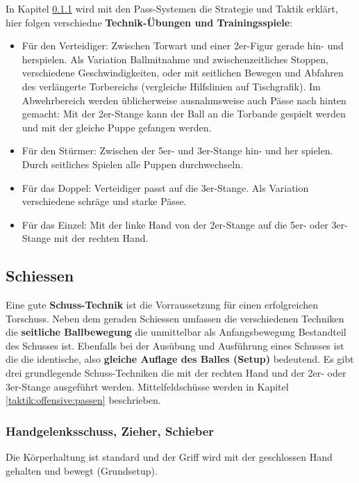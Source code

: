 In Kapitel \ref{} wird mit den Pass-Systemen die Strategie und Taktik erklärt, hier folgen verschiedne \textbf{Technik-Übungen und Trainingsspiele}: 
\begin{itemize}
    \item Für den Verteidiger: Zwischen Torwart und einer 2er-Figur gerade hin- und herspielen. Als Variation Ballmitnahme und zwischenzeitliches Stoppen, verschiedene Geschwindigkeiten, oder mit seitlichen Bewegen und Abfahren des verlängerte Torbereichs (vergleiche Hilfslinien auf Tischgrafik).  
Im Abwehrbereich werden üblicherweise ausnahmsweise auch Pässe nach hinten gemacht: Mit der 2er-Stange kann der Ball an die Torbande gespielt werden und mit der gleiche Puppe gefangen werden.
    \item Für den Stürmer: Zwischen der 5er- und 3er-Stange hin- und her spielen. Durch seitliches Spielen alle Puppen durchwechseln.
    \item Für das Doppel: Verteidiger passt auf die 3er-Stange. Als Variation verschiedene schräge und starke Pässe.  
    \item Für das Einzel: Mit der linke Hand von der 2er-Stange auf die 5er- oder 3er-Stange mit der rechten Hand.
\end{itemize}



\subsection{Schiessen}
\label{technik:offensive:schiessen}

Eine gute \textbf{Schuss-Technik} ist die Vorraussetzung für einen erfolgreichen Torschuss.
Neben dem geraden Schiessen umfassen die verschiedenen Techniken die \textbf{seitliche Ballbewegung} die unmittelbar als Anfangsbewegung Bestandteil des Schusses ist.
Ebenfalls bei der Ausübung und Ausführung eines Schusses ist die die identische, also \textbf{gleiche Auflage des Balles (Setup)} bedeutend.
Es gibt drei grundlegende Schuss-Techniken die mit der rechten Hand und der 2er- oder 3er-Stange ausgeführt werden. 
Mittelfeldschüsse werden in Kapitel \ref{taktik:offensive:passen} beschrieben.

\subsubsection{Handgelenksschuss, Zieher, Schieber}
Die Körperhaltung ist standard und der Griff wird mit der geschlossen Hand gehalten und bewegt (Grundsetup).

